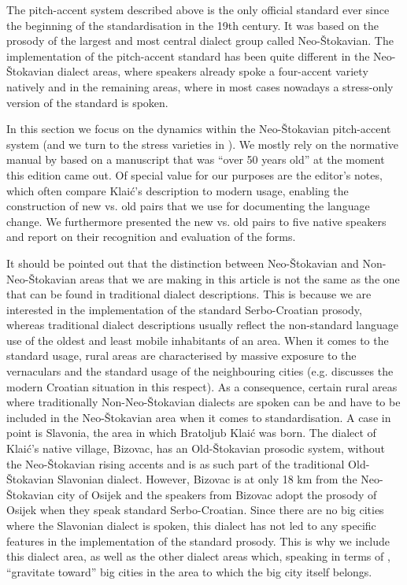\documentclass[output=paper,modfonts,nonflat
]{langsci/langscibook}
\begin{document}
The pitch-accent system described above is the only official standard ever since the beginning of the standardisation in the 19th century. It was based on the prosody of the largest and most central dialect group called Neo-Štokavian. The implementation of the pitch-accent standard has been quite different in the Neo-Štokavian dialect areas, where speakers already spoke a four-accent variety natively and in the remaining areas, where in most cases nowadays a stress-only version of the standard is spoken. 

In this section we focus on the dynamics within the Neo-Štokavian pitch-accent system (and we turn to the stress varieties in ). We mostly rely on the normative manual by \citet[]{Klaic2013} based on a manuscript that was ``over 50 years old'' at the moment this edition came out. Of special value for our purposes are the editor's notes, which often compare Klaić's description to modern usage, enabling the construction of new vs. old pairs that we use for documenting the language change. We furthermore presented the new vs. old pairs to five native speakers and report on their recognition and evaluation of the forms.

It should be pointed out that the distinction between Neo-Štokavian and Non-Neo-Štokavian areas that we are making in this article is not the same as the one that can be found in traditional dialect descriptions. This is because we are interested in the implementation of the standard Serbo-Croatian prosody, whereas traditional dialect descriptions usually reflect the non-standard language use of the oldest and least mobile inhabitants of an area. When it comes to the standard usage, rural areas are characterised by massive exposure to the vernaculars and the standard usage of the neighbouring cities (e.g. \citealt{Kapović2004} discusses the modern Croatian situation in this respect). As a consequence, certain rural areas where traditionally Non-Neo-Štokavian dialects are spoken can be and have to be included in the Neo-Štokavian area when it comes to standardisation. A case in point is Slavonia, the area in which Bratoljub Klaić was born. The dialect of Klaić's native village, Bizovac, has an Old-Štokavian prosodic system, without the Neo-Štokavian rising accents \citep[19]{Klaic2007} and is as such part of the traditional Old-Štokavian Slavonian dialect. However, Bizovac is at only 18 km from the Neo-Štokavian city of Osijek and the speakers from Bizovac adopt the prosody of Osijek when they speak standard Serbo-Croatian. Since there are no big cities where the Slavonian dialect is spoken, this dialect has not led to any specific features in the implementation of the standard prosody. This is why we include this dialect area, as well as the other dialect areas which, speaking in terms of \citet{Kapović2004}, ``gravitate toward'' big cities in the area to which the big city itself belongs. 
\end{document}
